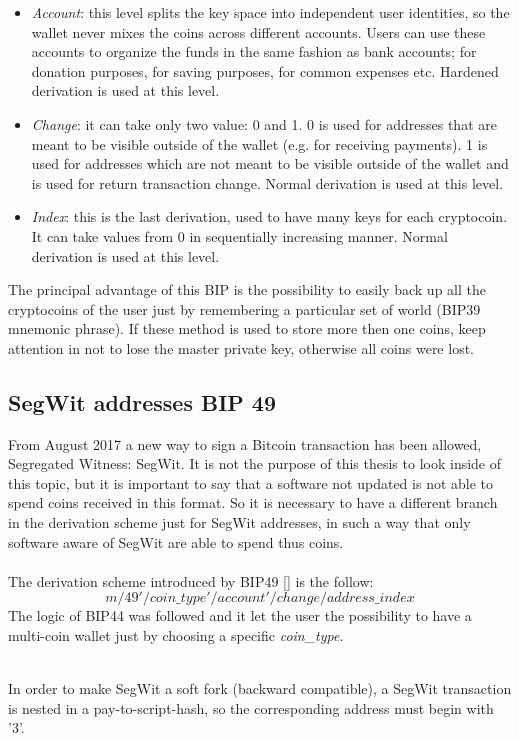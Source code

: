 \begin{itemize}
	\item \textit{Account}: this level splits the key space into independent user identities, so the wallet never mixes the coins across different accounts.
	Users can use these accounts to organize the funds in the same fashion as bank accounts; for donation purposes, for saving purposes, for common expenses etc.
	Hardened derivation is used at this level.
	\item \textit{Change}: it can take only two value: 0 and 1. 0 is used for addresses that are meant to be visible outside of the wallet (e.g. for receiving payments). 1 is used for addresses which are not meant to be visible outside of the wallet and is used for return transaction change.
	Normal derivation is used at this level.
	\item \textit{Index}: this is the last derivation, used to have many keys for each cryptocoin. It can take values from 0 in sequentially increasing manner. Normal derivation is used at this level.
\end{itemize}
The principal advantage of this BIP is the possibility to easily back up all the cryptocoins of the user just by remembering a particular set of world (BIP39 mnemonic phrase). If these method is used to store more then one coins, keep attention in not to lose the master private key, otherwise all coins were lost.

\subsection{SegWit addresses BIP 49}
From August 2017 a new way to sign a Bitcoin transaction has been allowed, Segregated Witness: SegWit. It is not the purpose of this thesis to look inside of this topic, but it is important to say that a software not updated is not able to spend coins received in this format. So it is necessary to have a different branch in the derivation scheme just for SegWit addresses, in such a way that only software aware of SegWit are able to spend thus coins.
\\ \\
The derivation scheme introduced by BIP49 [\cite{6}] is the follow:
\begin{equation*}
m / 49' / coin\_type' / account' / change / address\_index
\end{equation*}
The logic of BIP44 was followed and it let the user the possibility to have a multi-coin wallet just by choosing a specific \textit{coin\_type}.
\\ \\
\begin{remark}
	In order to make SegWit a soft fork (backward compatible), a SegWit transaction is nested in a pay-to-script-hash, so the corresponding address must begin with '3'.	
\end{remark}




